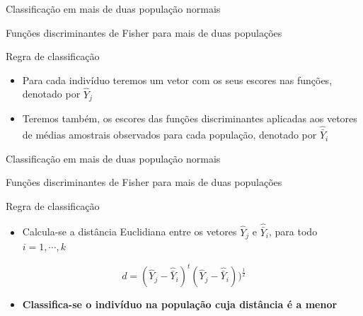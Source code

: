 \documentclass[
  ignorenonframetext,
  aspectratio=169,
]{beamer}
\providecommand{\tightlist}{%
  \setlength{\itemsep}{0pt}\setlength{\parskip}{0pt}}
\begin{document}
\begin{frame}{Classificação em mais de duas população normais}
\label{classificauxe7uxe3o-em-mais-de-duas-populauxe7uxe3o-normais-11}
\begin{block}{Funções discriminantes de Fisher para mais de duas
populações}
\label{funuxe7uxf5es-discriminantes-de-fisher-para-mais-de-duas-populauxe7uxf5es-2}
\begin{block}{Regra de classificação}
\label{regra-de-classificauxe7uxe3o}
\begin{itemize}
\item
  Para cada indivíduo teremos um vetor com os seus escores nas funções,
  denotado por \(\widehat{Y}_j\)
\item
  Teremos também, os escores das funções discriminantes aplicadas aos
  vetores de médias amostrais observados para cada população, denotado
  por \(\widehat{\bar{Y}}_i\)
\end{itemize}
\end{block}
\end{block}
\end{frame}

\begin{frame}{Classificação em mais de duas população normais}
\label{classificauxe7uxe3o-em-mais-de-duas-populauxe7uxe3o-normais-12}
\begin{block}{Funções discriminantes de Fisher para mais de duas
populações}
\label{funuxe7uxf5es-discriminantes-de-fisher-para-mais-de-duas-populauxe7uxf5es-3}
\begin{block}{Regra de classificação}
\label{regra-de-classificauxe7uxe3o-1}
\begin{itemize}
\tightlist
\item
  Calcula-se a distância Euclidiana entre os vetores \(\widehat{Y}_j\) e
  \(\widehat{\bar{Y}}_i\), para todo \(i = 1, \cdots, k\)
\end{itemize}

\[d = \displaystyle{(\widehat{Y}_j - \widehat{\bar{Y}}_i)^t(\widehat{Y}_j - \widehat{\bar{Y}}_i)})^{\frac{1}{2}} \]

\begin{itemize}
\tightlist
\item
  \textbf{Classifica-se o indivíduo na população cuja distância é a
  menor}
\end{itemize}
\end{block}
\end{block}
\end{frame}
\end{document}
